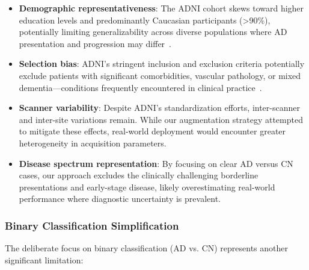 \documentclass[12pt, a4paper]{article}
\begin{document}
\begin{itemize}
    \item \textbf{Demographic representativeness}: The ADNI cohort skews toward higher education levels and predominantly Caucasian participants (>90\%), potentially limiting generalizability across diverse populations where AD presentation and progression may differ~\cite{jack2008alzheimer}.
    
    \item \textbf{Selection bias}: ADNI's stringent inclusion and exclusion criteria potentially exclude patients with significant comorbidities, vascular pathology, or mixed dementia—conditions frequently encountered in clinical practice~\cite{jack2008alzheimer}.
    
    \item \textbf{Scanner variability}: Despite ADNI's standardization efforts, inter-scanner and inter-site variations remain. While our augmentation strategy attempted to mitigate these effects, real-world deployment would encounter greater heterogeneity in acquisition parameters.
    
    \item \textbf{Disease spectrum representation}: By focusing on clear AD versus CN cases, our approach excludes the clinically challenging borderline presentations and early-stage disease, likely overestimating real-world performance where diagnostic uncertainty is prevalent.
\end{itemize}

\subsubsection{Binary Classification Simplification}

The deliberate focus on binary classification (AD vs. CN) represents another significant limitation:
\end{document}
